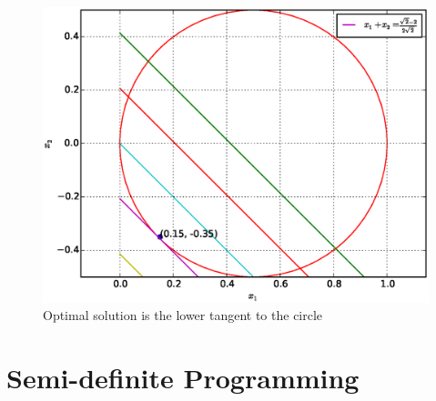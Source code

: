 \documentclass[journal,12pt,twocolumn]{IEEEtran}
\begin{document}
%
%
\begin{figure}[h]
\centering
\includegraphics[width=\columnwidth]{./figs/2.15.eps}
\caption{ Optimal solution is the lower tangent to the circle}
\label{fig.2.15}	
\end{figure}
%

\section{Semi-definite Programming}

\end{document}
